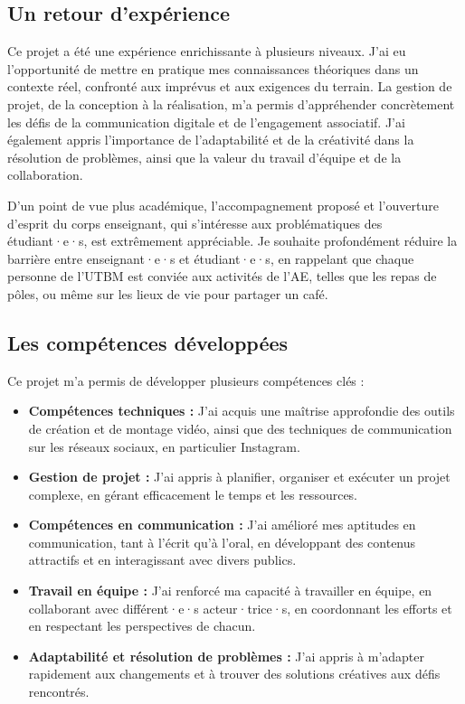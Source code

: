 
\subsection{Un retour d'expérience}\label{subsec:un-retour-d'experience}

Ce projet a été une expérience enrichissante à plusieurs niveaux.
J'ai eu l'opportunité de mettre en pratique mes connaissances théoriques dans un contexte réel, confronté aux imprévus et aux exigences du terrain.
La gestion de projet, de la conception à la réalisation, m'a permis d'appréhender concrètement les défis de la communication digitale et de l'engagement associatif.
J'ai également appris l'importance de l'adaptabilité et de la créativité dans la résolution de problèmes, ainsi que la valeur du travail d'équipe et de la collaboration.

D'un point de vue plus académique, l'accompagnement proposé et l'ouverture d'esprit du corps enseignant, qui s'intéresse aux problématiques des étudiant·e·s, est extrêmement appréciable.
Je souhaite profondément réduire la barrière entre enseignant·e·s et étudiant·e·s, en rappelant que chaque personne de l'\gls{UTBM} est conviée aux activités de l'AE, telles que les repas de pôles, ou même sur les lieux de vie pour partager un café.

\subsection{Les compétences développées}\label{subsec:les-competences-developpees}

Ce projet m'a permis de développer plusieurs compétences clés :
\begin{itemize}
    \item \textbf{Compétences techniques :} J'ai acquis une maîtrise approfondie des outils de création et de montage vidéo, ainsi que des techniques de communication sur les réseaux sociaux, en particulier Instagram.
    \item \textbf{Gestion de projet :} J'ai appris à planifier, organiser et exécuter un projet complexe, en gérant efficacement le temps et les ressources.
    \item \textbf{Compétences en communication :} J'ai amélioré mes aptitudes en communication, tant à l'écrit qu'à l'oral, en développant des contenus attractifs et en interagissant avec divers publics.
    \item \textbf{Travail en équipe :} J'ai renforcé ma capacité à travailler en équipe, en collaborant avec différent·e·s acteur·trice·s, en coordonnant les efforts et en respectant les perspectives de chacun.
    \item \textbf{Adaptabilité et résolution de problèmes :} J'ai appris à m'adapter rapidement aux changements et à trouver des solutions créatives aux défis rencontrés.
\end{itemize}


